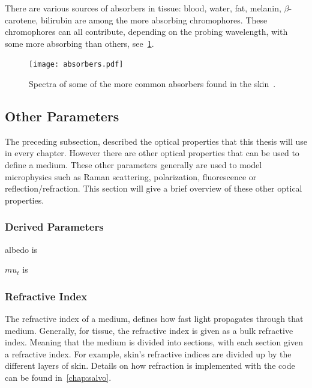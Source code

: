 There are various sources of absorbers in tissue: blood, water, fat, melanin, $\beta$-carotene, bilirubin are among the more absorbing chromophores. These chromophores can all contribute, depending on the probing wavelength, with some more absorbing than others, see~\cref{fig:absorb}. 

\begin{figure}
	\centering
	\texttt{[image: absorbers.pdf]}
	\caption{Spectra of some of the more common absorbers found in the skin~\cite{dixon2005photochemcad,photoprahl2017,segelstein1981complex,pope1997absorption,jacques2013optical,van2004determination,saidi1992transcutaneous,iglesias2015biophysically,bashkatov2011optical,sarna2006physical}.}
	\label{fig:absorb}
\end{figure}


\subsection*{Other Parameters}\label{sec:other}
The preceding subsection, described the optical properties that this thesis will use in every chapter. However there are other optical properties that can be used to define a medium. These other parameters generally are used to model microphysics such as Raman scattering, polarization, fluorescence or reflection/refraction. This section will give a brief overview of these other optical properties.

\subsubsection{Derived Parameters}

albedo is 

$mu_t$ is

\medskip

\subsubsection*{Refractive Index}
The refractive index of a medium, defines how fast light propagates through that medium. Generally, for tissue, the refractive index is given as a bulk refractive index. Meaning that the medium is divided into sections, with each section given a refractive index. For example, skin's refractive indices are divided up by the different layers of skin. Details on how refraction is implemented with the code can  be found in~\cref{chap:salvo}.

\medskip

